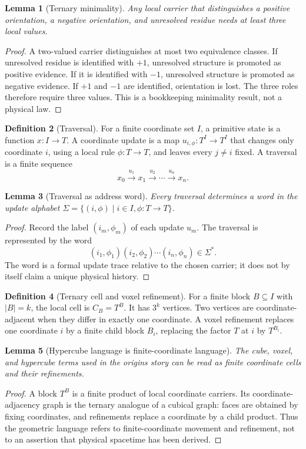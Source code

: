 \documentclass[11pt]{article}
\theoremstyle{definition}
\newtheorem{definition}{Definition}[section]
\theoremstyle{plain}
\newtheorem{lemma}[definition]{Lemma}
\theoremstyle{remark}
\begin{document}
\begin{lemma}[Ternary minimality]
Any local carrier that distinguishes a positive orientation, a negative
orientation, and unresolved residue needs at least three local values.
\end{lemma}
\begin{proof}
A two-valued carrier distinguishes at most two equivalence classes. If
unresolved residue is identified with \(+1\), unresolved structure is promoted
as positive evidence. If it is identified with \(-1\), unresolved structure is
promoted as negative evidence. If \(+1\) and \(-1\) are identified, orientation
is lost. The three roles therefore require three values. This is a bookkeeping
minimality result, not a physical law.
\end{proof}

\begin{definition}[Traversal]
For a finite coordinate set \(I\), a primitive state is a function \(x:I\to T\).
A coordinate update is a map \(u_{i,\phi}:T^I\to T^I\) that changes only
coordinate \(i\), using a local rule \(\phi:T\to T\), and leaves every
\(j\neq i\) fixed. A traversal is a finite sequence
\[
x_0 \xrightarrow{u_1} x_1 \xrightarrow{u_2}\cdots
\xrightarrow{u_n} x_n .
\]
\end{definition}

\begin{lemma}[Traversal as address word]
Every traversal determines a word in the update alphabet
\(\Sigma=\{(i,\phi)\mid i\in I,\phi:T\to T\}\).
\end{lemma}
\begin{proof}
Record the label \((i_m,\phi_m)\) of each update \(u_m\). The traversal is
represented by the word
\[
(i_1,\phi_1)(i_2,\phi_2)\cdots(i_n,\phi_n)\in\Sigma^\ast.
\]
The word is a formal update trace relative to the chosen carrier; it does not
by itself claim a unique physical history.
\end{proof}

\begin{definition}[Ternary cell and voxel refinement]
For a finite block \(B\subseteq I\) with \(|B|=k\), the local cell is
\(C_B=T^B\). It has \(3^k\) vertices. Two vertices are coordinate-adjacent
when they differ in exactly one coordinate. A voxel refinement replaces one
coordinate \(i\) by a finite child block \(B_i\), replacing the factor \(T\) at
\(i\) by \(T^{B_i}\).
\end{definition}

\begin{lemma}[Hypercube language is finite-coordinate language]
The cube, voxel, and hypercube terms used in the origins story can be read as
finite coordinate cells and their refinements.
\end{lemma}
\begin{proof}
A block \(T^B\) is a finite product of local coordinate carriers. Its
coordinate-adjacency graph is the ternary analogue of a cubical graph: faces
are obtained by fixing coordinates, and refinements replace a coordinate by a
child product. Thus the geometric language refers to finite-coordinate
movement and refinement, not to an assertion that physical spacetime has been
derived.
\end{proof}
\end{document}
